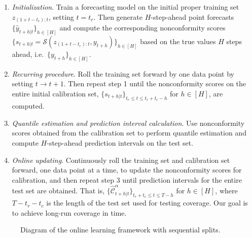 \documentclass[
  11pt,
  12pt]{article}
\theoremstyle{plain}
\theoremstyle{remark}
\begin{document}
\begin{enumerate}
\def\labelenumi{\arabic{enumi}.}
\item
  \emph{Initialization}. Train a forecasting model on the initial proper
  training set \(z_{(1+t-t_r):t}\), setting \(t=t_r\). Then generate
  \(H\)-step-ahead point forecasts \(\{\hat{y}_{t+h|t}\}_{h\in[H]}\) and
  compute the corresponding nonconformity scores
  \(\{s_{t+h|t}=\mathcal{S}(z_{(1+t-t_r):t}, y_{t+h})\}_{h\in[H]}\)
  based on the true values \(H\) steps ahead,
  i.e.~\(\{y_{t+h}\}_{h\in[H]}\).
\item
  \emph{Recurring procedure}. Roll the training set forward by one data
  point by setting \(t \rightarrow t+1\). Then repeat step 1 until the
  nonconformity scores on the entire initial calibration set,
  \(\{s_{t+h|t}\}_{t_r \leq t \leq t_r+t_c-h}\) for \(h\in[H]\), are
  computed.
\item
  \emph{Quantile estimation and prediction interval calculation}. Use
  nonconformity scores obtained from the calibration set to perform
  quantile estimation and compute \(H\)-step-ahead prediction intervals
  on the test set.
\item
  \emph{Online updating}. Continuously roll the training set and
  calibration set forward, one data point at a time, to update the
  nonconformity scores for calibration, and then repeat step 3 until
  prediction intervals for the entire test set are obtained. That is,
  \(\{\hat{\mathcal{C}}_{t+h|t}^{\alpha}\}_{t_r+t_c \leq t \leq T-h}\)
  for \(h \in [H]\), where \(T-t_r-t_c\) is the length of the test set
  used for testing coverage. Our goal is to achieve long-run coverage in
  time.
\end{enumerate}

\begin{figure}


\caption{\label{fig-flowchart}Diagram of the online learning framework
with sequential splits.}

\end{figure}%
\end{document}
